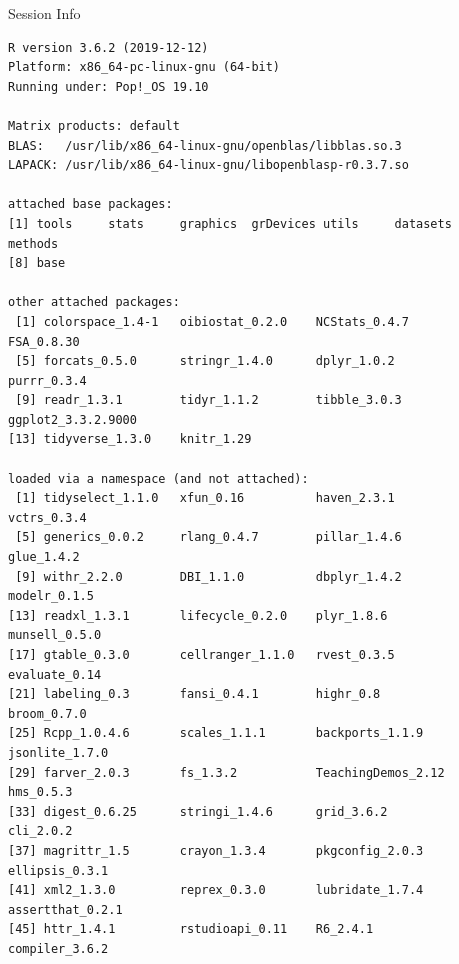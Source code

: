 \documentclass[10pt,handout]{beamer}\usepackage[]{graphicx}\usepackage[]{color}
\makeatletter
\newenvironment{kframe}{%
 \def\at@end@of@kframe{}%
 \ifinner\ifhmode%
  \def\at@end@of@kframe{\end{minipage}}%
  \begin{minipage}{\columnwidth}%
 \fi\fi%
 \def\FrameCommand##1{\hskip\@totalleftmargin \hskip-\fboxsep
 \colorbox{shadecolor}{##1}\hskip-\fboxsep
     \hskip-\linewidth \hskip-\@totalleftmargin \hskip\columnwidth}%
 \MakeFramed {\advance\hsize-\width
   \@totalleftmargin\z@ \linewidth\hsize
   \@setminipage}}%
 {\par\unskip\endMakeFramed%
 \at@end@of@kframe}
\newenvironment{knitrout}{}{} %
\makeatother
\begin{document}
	
	\begin{frame}[fragile]{Session Info}
		\tiny
		
\begin{knitrout}\tiny
{}\color{fgcolor}\begin{kframe}
\begin{verbatim}
R version 3.6.2 (2019-12-12)
Platform: x86_64-pc-linux-gnu (64-bit)
Running under: Pop!_OS 19.10

Matrix products: default
BLAS:   /usr/lib/x86_64-linux-gnu/openblas/libblas.so.3
LAPACK: /usr/lib/x86_64-linux-gnu/libopenblasp-r0.3.7.so

attached base packages:
[1] tools     stats     graphics  grDevices utils     datasets  methods  
[8] base     

other attached packages:
 [1] colorspace_1.4-1   oibiostat_0.2.0    NCStats_0.4.7      FSA_0.8.30        
 [5] forcats_0.5.0      stringr_1.4.0      dplyr_1.0.2        purrr_0.3.4       
 [9] readr_1.3.1        tidyr_1.1.2        tibble_3.0.3       ggplot2_3.3.2.9000
[13] tidyverse_1.3.0    knitr_1.29        

loaded via a namespace (and not attached):
 [1] tidyselect_1.1.0   xfun_0.16          haven_2.3.1        vctrs_0.3.4       
 [5] generics_0.0.2     rlang_0.4.7        pillar_1.4.6       glue_1.4.2        
 [9] withr_2.2.0        DBI_1.1.0          dbplyr_1.4.2       modelr_0.1.5      
[13] readxl_1.3.1       lifecycle_0.2.0    plyr_1.8.6         munsell_0.5.0     
[17] gtable_0.3.0       cellranger_1.1.0   rvest_0.3.5        evaluate_0.14     
[21] labeling_0.3       fansi_0.4.1        highr_0.8          broom_0.7.0       
[25] Rcpp_1.0.4.6       scales_1.1.1       backports_1.1.9    jsonlite_1.7.0    
[29] farver_2.0.3       fs_1.3.2           TeachingDemos_2.12 hms_0.5.3         
[33] digest_0.6.25      stringi_1.4.6      grid_3.6.2         cli_2.0.2         
[37] magrittr_1.5       crayon_1.3.4       pkgconfig_2.0.3    ellipsis_0.3.1    
[41] xml2_1.3.0         reprex_0.3.0       lubridate_1.7.4    assertthat_0.2.1  
[45] httr_1.4.1         rstudioapi_0.11    R6_2.4.1           compiler_3.6.2    
\end{verbatim}
\end{kframe}
\end{knitrout}
		
	\end{frame}
	
\end{document}
